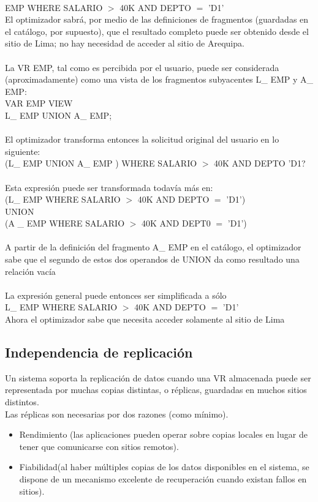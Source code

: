 \documentclass[10pt,a4paper,oneside]{article}
\begin{document}
\begin {itemize}
\\EMP WHERE SALARIO $>$ 40K AND DEPTO $=$ 'D1'
\\El optimizador sabr\'a, por medio de las definiciones de fragmentos (guardadas en el cat\'alogo, por supuesto), que el resultado completo puede ser obtenido desde el sitio de Lima; no hay necesidad de acceder al sitio de Arequipa.
\\\\La VR EMP, tal como es percibida por el usuario, puede ser considerada (aproximadamente) como una vista de los fragmentos subyacentes L\_ EMP y A\_ EMP:
\\VAR EMP VIEW 
\\L\_ EMP UNION A\_ EMP;
\\\\El optimizador transforma entonces la solicitud original del usuario en lo siguiente:
\\ (L\_ EMP UNION A\_ EMP ) WHERE SALARIO $>$ 40K AND DEPTO  'D1?
\\\\Esta expresi\'on puede ser transformada todav\'ia m\'as en:
\\(L\_ EMP WHERE SALARIO $>$ 40K AND DEPTO $=$ 'D1')
\\UNION 
\\(A \_ EMP WHERE SALARIO $>$ 40K AND DEPT0 $=$ 'D1')
\\\\A partir de la definici\'on del fragmento A\_ EMP en el cat\'alogo, el optimizador sabe que el segundo de estos dos operandos de UNION da como resultado una relaci\'on vac\'ia 
\\\\La expresi\'on general puede entonces ser simplificada a s\'olo
\\L\_ EMP WHERE SALARIO $>$ 40K AND DEPTO $=$ 'D1'
\\Ahora el optimizador sabe que necesita acceder solamente al sitio de Lima

\subsection{Independencia de replicaci\'on}
Un sistema soporta la replicaci\'on de datos cuando una VR almacenada puede ser representada por muchas copias distintas, o r\'eplicas, guardadas en muchos sitios distintos. 
\\Las r\'eplicas son necesarias por dos razones (como m\'inimo). 
\begin{itemize}
\item Rendimiento (las aplicaciones pueden operar sobre copias locales en lugar de tener que comunicarse con sitios remotos). 
\item Fiabilidad(al haber m\'ultiples copias de los datos disponibles en el sistema, se dispone de un mecanismo excelente de recuperaci\'on cuando existan fallos en sitios).
\end{itemize}


\end{itemize}
\end{document}
